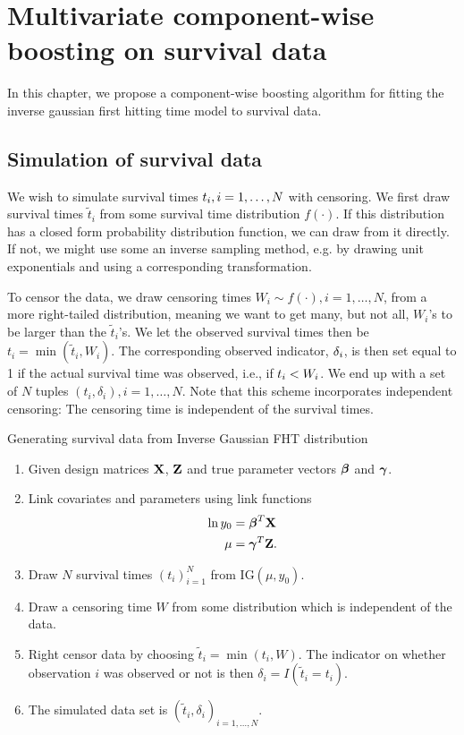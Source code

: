 \chapter{Multivariate component-wise boosting on survival data}
In this chapter, we propose a component-wise boosting algorithm for fitting the inverse gaussian first hitting time model to survival data.

\section{Simulation of survival data}
We wish to simulate survival times $t_{i},i=1,\ldots,N$ with censoring. We first draw survival times $\tilde{t}_i$ from some survival time distribution $f(\cdot)$. If this distribution has a closed form probability distribution function, we can draw from it directly. If not, we might use some an inverse sampling method, e.g. by drawing unit exponentials and using a corresponding transformation.

To censor the data, we draw censoring times $W_i\sim f(\cdot),i=1,\ldots,N$, from a more right-tailed distribution, meaning we want to get many, but not all, $W_i$'s to be larger than the $\tilde{t}_i$'s. We let the observed survival times then be $t_i=\min(\tilde{t}_i,W_i)$.
The corresponding observed indicator, $\delta_{i}$, is then set equal to 1 if the actual survival time was observed, i.e., if $t_{i}<W_i$. We end up with a set of $N$ tuples $(t_i,\delta_i),i=1,\ldots,N$. Note that this scheme incorporates independent censoring: The censoring time is independent of the survival times.

\begin{algorithm}
\caption{Generating survival data from Inverse Gaussian FHT distribution}
\label{algo:FHT-sim}
\begin{enumerate}
    \item Given design matrices $\mathbf{X}$, $\mathbf{Z}$ and true parameter vectors $\boldsymbol{\beta}$ and $\boldsymbol{\gamma}$.
    \item Link covariates and parameters using link functions
        \begin{align*}
            \ln y_0&=\boldsymbol{\beta}^T\mathbf{X} \\
            \mu&=\boldsymbol{\gamma}^T\mathbf{Z}.
        \end{align*}
    \item Draw $N$ survival times $(t_i)_{i=1}^N$ from IG$(\mu,y_0)$.
    \item Draw a censoring time $W$ from some distribution which is independent of the data.
    \item Right censor data by choosing $\widetilde{t}_i=\min(t_i,W)$. The indicator on whether observation $i$ was observed or not is then $\delta_i=I(\widetilde{t}_i=t_i)$.
    \item The simulated data set is $(\widetilde{t}_i,\delta_i)_{i=1,\ldots,N}$.
\end{enumerate}
\end{algorithm}